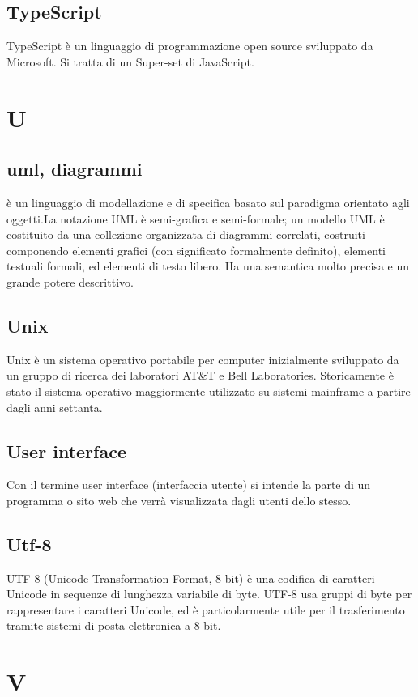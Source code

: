 \subsection{TypeScript}  TypeScript è un linguaggio di programmazione open source sviluppato da Microsoft. Si tratta di un Super-set di JavaScript.

\newpage \section{U}
\subsection{uml, diagrammi }  è un linguaggio di modellazione e di specifica basato sul paradigma orientato agli oggetti.La notazione UML è semi-grafica e semi-formale; un modello UML è costituito da una collezione organizzata di diagrammi correlati, costruiti componendo elementi grafici (con significato formalmente definito), elementi testuali formali, ed elementi di testo libero. Ha una semantica molto precisa e un grande potere descrittivo. 
\subsection{Unix}  Unix è un sistema operativo portabile per computer inizialmente sviluppato da un gruppo di ricerca dei laboratori AT\&T e Bell Laboratories. Storicamente è stato il sistema operativo maggiormente utilizzato su sistemi mainframe a partire dagli anni settanta.
\subsection{User interface}  Con il termine user interface (interfaccia utente) si intende la parte di un programma o sito web che verrà visualizzata dagli utenti dello stesso.
\subsection{Utf-8 }  UTF-8 (Unicode Transformation Format, 8 bit) è una codifica di caratteri Unicode in sequenze di lunghezza variabile di byte. UTF-8 usa gruppi di byte per rappresentare i caratteri Unicode, ed è particolarmente utile per il trasferimento tramite sistemi di posta elettronica a 8-bit.

\newpage \section{V}
